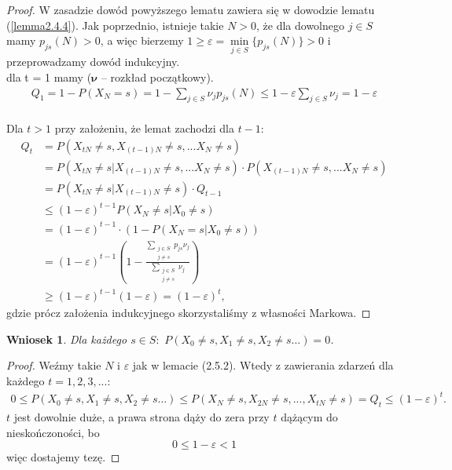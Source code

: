 \documentclass[a4paper]{article}
\theoremstyle{defn}
\theoremstyle{theorem}
\theoremstyle{lemma}
\theoremstyle{cor}
\newtheorem{cor}[defn]{Wniosek}
\theoremstyle{fact}
\begin{document}
\begin{proof}
W zasadzie dowód powyższego lematu zawiera się w dowodzie lematu (\ref{lemma2.4.4}). Jak poprzednio, istnieje takie $N > 0$, że dla dowolnego $j \in S$ mamy $p_{js}(N) > 0$, a więc bierzemy $1 \geq \varepsilon = \min\limits_{j \in S} \{p_{js}(N)\} > 0$ i przeprowadzamy dowód indukcyjny.\\
dla t = 1 mamy ($\boldsymbol{\nu}$ – rozkład początkowy).\\
\begin{align*}
Q_1 = 1 - P(X_N = s) = 1 - \sum _{j \in S} \nu_jp_{js}(N) \leq 1 - \varepsilon \sum _{j \in S} \nu_j = 1 - \varepsilon
\end{align*}
\\
Dla $t > 1$ przy założeniu, że lemat zachodzi dla $t-1$:
\begin{align*}
Q_{t} &= P(X_{tN} \neq s, X_{(t-1)N} \neq s, ... X_N \neq s) \\
&= P(X_{tN} \neq s | X_{(t-1)N} \neq s, ... X_N \neq s) \cdot P(X_{(t-1)N} \neq s, ... X_N \neq s) \\
&= P(X_{tN} \neq s | X_{(t-1)N} \neq s) \cdot Q_{t-1}\\
&\leq (1- \varepsilon)^{t-1} P(X_N \neq s|X_0 \neq s) \\
&= (1- \varepsilon)^{t-1} \cdot (1 - P(X_N = s|X_0 \neq s)) \\
&= (1- \varepsilon)^{t-1} \left(1 - \frac{\sum_{\substack{j \in S\\j \neq s}} p_{js}\nu_j}{\sum_{\substack{j \in S\\j \neq s}} \nu_j}\right) \\
&\geq (1-\varepsilon)^{t-1} (1-\varepsilon) = (1-\varepsilon)^t,
\end{align*}
gdzie prócz założenia indukcyjnego skorzystaliśmy z własności Markowa.
\end{proof}
\begin{cor}\label{cor2.5.3}
Dla każdego $s \in S: \,\, P(X_0 \neq s, X_{1} \neq s, X_2 \neq s ...) = 0$.
\end{cor}
\begin{proof}
Weźmy takie $N$ i $\varepsilon$ jak w lemacie (2.5.2). Wtedy z zawierania zdarzeń dla każdego $t = 1,2,3,...$:
\begin{align*}
0 \leq P(X_0 \neq s, X_{1} \neq s, X_2 \neq s ...) \leq P(X_N \neq s, X_{2N} \neq s, ..., X_{tN} \neq s) = Q_t \leq (1-\varepsilon)^t.
\end{align*}
$t$ jest dowolnie duże, a prawa strona dąży do zera przy $t$ dążącym do nieskończoności, bo $$0 \leq 1 - \varepsilon < 1$$ więc dostajemy tezę.
\end{proof}
\end{document}
